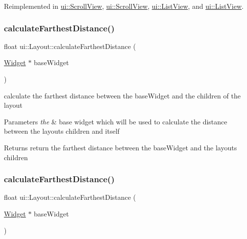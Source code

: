 Reimplemented in \hyperlink{classui_1_1ScrollView_a5a7c20a6964a19bfa19bb6522de97055}{ui\+::\+Scroll\+View}, \hyperlink{classui_1_1ScrollView_a84baef5d2ad68df9c19a73da551a780d}{ui\+::\+Scroll\+View}, \hyperlink{classui_1_1ListView_a48d15dfd548d451a87af9a1300343725}{ui\+::\+List\+View}, and \hyperlink{classui_1_1ListView_ac05cf0e2ff70c59b487662364d55eebc}{ui\+::\+List\+View}.

\mbox{\label{classui_1_1Layout_a57187bccc77bc2ca377817bb1a1a15a1}} 
\subsubsection{\texorpdfstring{calculate\+Farthest\+Distance()}{calculateFarthestDistance()}\hspace{0.1cm}{\footnotesize\ttfamily [1/2]}}
{\footnotesize\ttfamily float ui\+::\+Layout\+::calculate\+Farthest\+Distance (\begin{DoxyParamCaption}\item[{\hyperlink{classui_1_1Widget}{Widget} $\ast$}]{base\+Widget }\end{DoxyParamCaption})\hspace{0.3cm}{\ttfamily [protected]}}

calculate the farthest distance between the base\+Widget and the children of the layout 
\begin{DoxyParams}{Parameters}
{\em the} & base widget which will be used to calculate the distance between the layout\textquotesingle{}s children and itself \\
\hline
\end{DoxyParams}
\begin{DoxyReturn}{Returns}
return the farthest distance between the base\+Widget and the layout\textquotesingle{}s children 
\end{DoxyReturn}
\mbox{\label{classui_1_1Layout_a57187bccc77bc2ca377817bb1a1a15a1}} 
\subsubsection{\texorpdfstring{calculate\+Farthest\+Distance()}{calculateFarthestDistance()}\hspace{0.1cm}{\footnotesize\ttfamily [2/2]}}
{\footnotesize\ttfamily float ui\+::\+Layout\+::calculate\+Farthest\+Distance (\begin{DoxyParamCaption}\item[{\hyperlink{classui_1_1Widget}{Widget} $\ast$}]{base\+Widget }\end{DoxyParamCaption})\hspace{0.3cm}{\ttfamily [protected]}}

